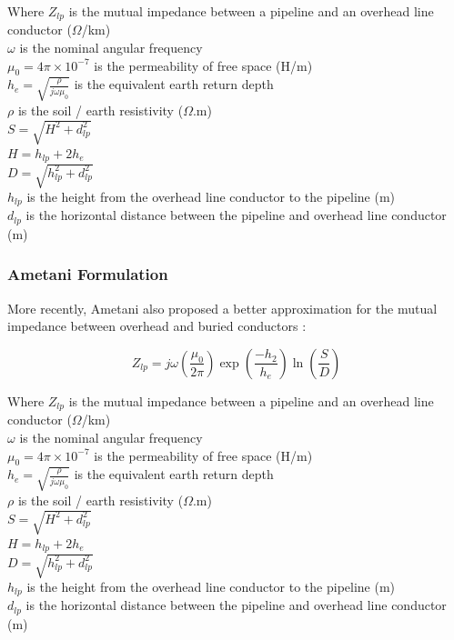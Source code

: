 \documentclass{article}
\begin{document}
Where $Z_{lp}$ is the mutual impedance between a pipeline and an overhead line conductor ($\Omega$/km) \\
\hphantom{Where} $\omega$ is the nominal angular frequency \\
\hphantom{Where} $\mu_{0} = 4 \pi \times 10^{-7}$ is the permeability of free space (H/m) \\
\hphantom{Where} $h_{e} = \sqrt{\frac{\rho}{j \omega \mu_{0}}}$ is the equivalent earth return depth \\
\hphantom{Where} $\rho$ is the soil / earth resistivity ($\Omega$.m) \\
\hphantom{Where} $S = \sqrt{H^{2} + d_{lp}^{2}}$ \\
\hphantom{Where} $H = h_{lp} + 2h_{e}$ \\
\hphantom{Where} $D = \sqrt{h_{lp}^{2} + d_{lp}^{2}}$ \\
\hphantom{Where} $h_{lp}$ is the height from the overhead line conductor to the pipeline (m) \\
\hphantom{Where} $d_{lp}$ is the horizontal distance between the pipeline and overhead line conductor (m)

\subsubsection{Ametani Formulation}
More recently, Ametani also proposed a better approximation for the mutual impedance between overhead and buried conductors \cite{ametani_2009}: 

\begin{equation}
Z_{lp} = j \omega \left( \frac{\mu_{0}}{2 \pi} \right) \exp \left( \frac{-h_{2}}{h_{e}} \right) \ln \left( \frac{S}{D} \right)
\end{equation}

Where $Z_{lp}$ is the mutual impedance between a pipeline and an overhead line conductor ($\Omega$/km) \\
\hphantom{Where} $\omega$ is the nominal angular frequency \\
\hphantom{Where} $\mu_{0} = 4 \pi \times 10^{-7}$ is the permeability of free space (H/m) \\
\hphantom{Where} $h_{e} = \sqrt{\frac{\rho}{j \omega \mu_{0}}}$ is the equivalent earth return depth \\
\hphantom{Where} $\rho$ is the soil / earth resistivity ($\Omega$.m) \\
\hphantom{Where} $S = \sqrt{H^{2} + d_{lp}^{2}}$ \\
\hphantom{Where} $H = h_{lp} + 2h_{e}$ \\
\hphantom{Where} $D = \sqrt{h_{lp}^{2} + d_{lp}^{2}}$ \\
\hphantom{Where} $h_{lp}$ is the height from the overhead line conductor to the pipeline (m) \\
\hphantom{Where} $d_{lp}$ is the horizontal distance between the pipeline and overhead line conductor (m)
\end{document}
